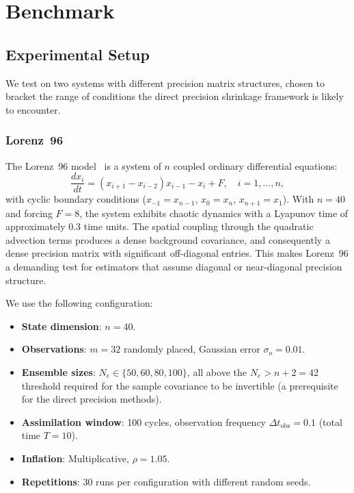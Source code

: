 \chapter{Benchmark}
\label{ch:benchmark}

\section{Experimental Setup}
\label{sec:setup}

We test on two systems with different precision matrix structures, chosen to bracket the range of conditions the direct precision shrinkage framework is likely to encounter.

\subsection{Lorenz~96}
\label{sec:lorenz96}

The Lorenz~96 model~\citep{lorenz1996predictability} is a system of $n$ coupled ordinary differential equations:
\begin{equation}
\label{eq:lorenz96}
\frac{dx_i}{dt} = (x_{i+1} - x_{i-2})x_{i-1} - x_i + F, \quad i = 1, \ldots, n,
\end{equation}
with cyclic boundary conditions ($x_{-1} = x_{n-1}$, $x_0 = x_n$, $x_{n+1} = x_1$). With $n = 40$ and forcing $F = 8$, the system exhibits chaotic dynamics with a Lyapunov time of approximately 0.3 time units. The spatial coupling through the quadratic advection terms produces a dense background covariance, and consequently a dense precision matrix with significant off-diagonal entries. This makes Lorenz~96 a demanding test for estimators that assume diagonal or near-diagonal precision structure.

We use the following configuration:
\begin{itemize}
\item \textbf{State dimension}: $n = 40$.
\item \textbf{Observations}: $m = 32$ randomly placed, Gaussian error $\sigma_o = 0.01$.
\item \textbf{Ensemble sizes}: $N_e \in \{50, 60, 80, 100\}$, all above the $N_e > n + 2 = 42$ threshold required for the sample covariance to be invertible (a prerequisite for the direct precision methods).
\item \textbf{Assimilation window}: 100 cycles, observation frequency $\Delta t_{\text{obs}} = 0.1$ (total time $T = 10$).
\item \textbf{Inflation}: Multiplicative, $\rho = 1.05$.
\item \textbf{Repetitions}: 30 runs per configuration with different random seeds.
\end{itemize}

